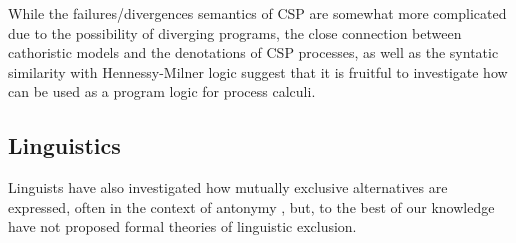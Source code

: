 While the failures/divergences semantics of CSP are somewhat more
complicated due to the possibility of diverging programs, the close
connection between cathoristic models and the denotations of CSP processes,
as well as the syntatic similarity with Hennessy-Milner logic suggest
that it is fruitful to investigate how \cathoristic{} can be used
as a program logic for process calculi.

\subsection{Linguistics}

Linguists have also investigated how mutually exclusive alternatives
are expressed, often in the context of antonymy
\cite{OKeeffeA:rouhanocl,AronoffM:hanlin,AllanK:conencos}, but, to the
best of our knowledge have not proposed formal theories of linguistic
exclusion.

